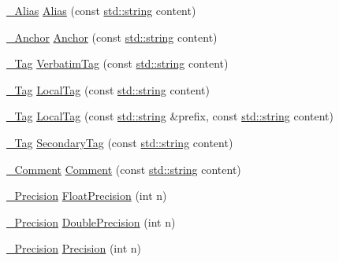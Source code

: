 \begin{DoxyCompactItemize}
\item 
\mbox{\hyperlink{struct_y_a_m_l_1_1___alias}{\+\_\+\+Alias}} \mbox{\hyperlink{namespace_y_a_m_l_a41c2352843482997c8336b5ac17bf0f4}{Alias}} (const \mbox{\hyperlink{glad_8h_ac83513893df92266f79a515488701770}{std\+::string}} content)
\item 
\mbox{\hyperlink{struct_y_a_m_l_1_1___anchor}{\+\_\+\+Anchor}} \mbox{\hyperlink{namespace_y_a_m_l_a6f50a59e00212914b4313bf361206079}{Anchor}} (const \mbox{\hyperlink{glad_8h_ac83513893df92266f79a515488701770}{std\+::string}} content)
\item 
\mbox{\hyperlink{struct_y_a_m_l_1_1___tag}{\+\_\+\+Tag}} \mbox{\hyperlink{namespace_y_a_m_l_a8ea1f58b5c3cd102ad4d6a2482f7ea31}{Verbatim\+Tag}} (const \mbox{\hyperlink{glad_8h_ac83513893df92266f79a515488701770}{std\+::string}} content)
\item 
\mbox{\hyperlink{struct_y_a_m_l_1_1___tag}{\+\_\+\+Tag}} \mbox{\hyperlink{namespace_y_a_m_l_a4b116759448ade5321aeb98fd2f2c209}{Local\+Tag}} (const \mbox{\hyperlink{glad_8h_ac83513893df92266f79a515488701770}{std\+::string}} content)
\item 
\mbox{\hyperlink{struct_y_a_m_l_1_1___tag}{\+\_\+\+Tag}} \mbox{\hyperlink{namespace_y_a_m_l_a0763bf556933f609f1e7488e632ab597}{Local\+Tag}} (const \mbox{\hyperlink{glad_8h_ac83513893df92266f79a515488701770}{std\+::string}} \&prefix, const \mbox{\hyperlink{glad_8h_ac83513893df92266f79a515488701770}{std\+::string}} content)
\item 
\mbox{\hyperlink{struct_y_a_m_l_1_1___tag}{\+\_\+\+Tag}} \mbox{\hyperlink{namespace_y_a_m_l_a95e86040e490f096ee981454e1a34a35}{Secondary\+Tag}} (const \mbox{\hyperlink{glad_8h_ac83513893df92266f79a515488701770}{std\+::string}} content)
\item 
\mbox{\hyperlink{struct_y_a_m_l_1_1___comment}{\+\_\+\+Comment}} \mbox{\hyperlink{namespace_y_a_m_l_a17871d5ffb83e432d5d502cd8ce1a849}{Comment}} (const \mbox{\hyperlink{glad_8h_ac83513893df92266f79a515488701770}{std\+::string}} content)
\item 
\mbox{\hyperlink{struct_y_a_m_l_1_1___precision}{\+\_\+\+Precision}} \mbox{\hyperlink{namespace_y_a_m_l_ad8d898600ad3706488afdea02142a098}{Float\+Precision}} (int n)
\item 
\mbox{\hyperlink{struct_y_a_m_l_1_1___precision}{\+\_\+\+Precision}} \mbox{\hyperlink{namespace_y_a_m_l_a5bfff5856ad42516e6ac781009239eef}{Double\+Precision}} (int n)
\item 
\mbox{\hyperlink{struct_y_a_m_l_1_1___precision}{\+\_\+\+Precision}} \mbox{\hyperlink{namespace_y_a_m_l_a1b9866926430099c6e1be490b080cb65}{Precision}} (int n)

\end{DoxyCompactItemize}
